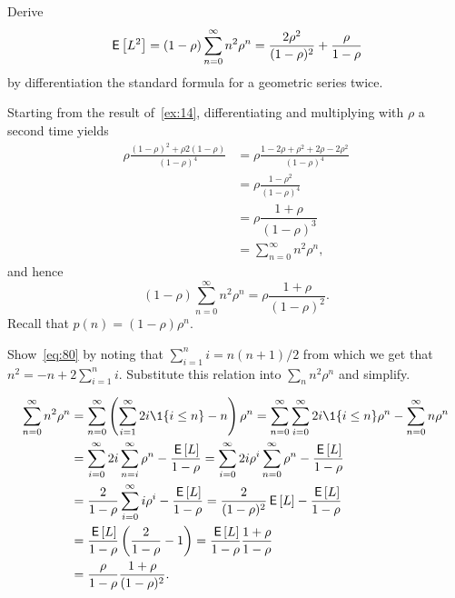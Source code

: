 \begin{extra}\label{ex:56}
  Derive
\begin{equation}\label{eq:80}
  \,\mathsf{E}\left[L^2\right]= (1-\rho) \sum_{n=0}^\infty n^2 \rho^n = \frac{2\rho^2}{(1-\rho)^2} + \frac{\rho}{1-\rho}
\end{equation}
by differentiation the standard formula for a geometric series twice.
\begin{solution}
    Starting from the result of~\cref{ex:14},  differentiating and multiplying with $\rho$ a second time yields
\begin{equation*}
  \begin{split}
\rho \frac{(1-\rho)^2 + \rho2(1-\rho)}{(1-\rho)^4} 
&= \rho \frac{1-2\rho+\rho^2 + 2\rho-2\rho^2}{(1-\rho)^4} \\
&= \rho \frac{1-\rho^2}{(1-\rho)^4} \\
&=\rho \dfrac{1+\rho}{(1-\rho)^3}\\
&=\sum_{n=0}^{\infty}n^2\rho^n,
  \end{split}
\end{equation*}
and hence
\begin{equation*}
(1-\rho)\sum_{n=0}^{\infty}n^2\rho^n = \rho\dfrac{1+\rho}{(1-\rho)^2}.
\end{equation*}
Recall that $p(n) = (1-\rho)\rho^n$. 
\end{solution}
\end{extra}


\begin{extra} Show~\cref{eq:80} by noting that
$\sum_{i=1}^n i= n(n+1)/2$ from which we get that
$n^2 = -n + 2\sum_{i=1}^n i$. Substitute this relation into
$\sum_n n^2 \rho^n$ and simplify.
\begin{solution}
\begin{align*}
    \sum_{n=0}^\infty n^2 \rho^n 
&=    \sum_{n=0}^\infty \left(\sum_{i=1}^\infty 2i \1{i\leq n}  - n\right)\rho^n 
=    \sum_{n=0}^\infty \sum_{i=0}^\infty 2i\1{i\leq n}\rho^n  - \sum_{n=0}^\infty n\rho^n \\
&=    \sum_{i=0}^\infty 2i \sum_{n=i}^\infty \rho^n  - \frac{\E L}{1-\rho} 
=    \sum_{i=0}^\infty 2i \rho^i \sum_{n=0}^\infty \rho^n  - \frac{\E L}{1-\rho} \\
&=    \frac2{1-\rho} \sum_{i=0}^\infty i \rho^i   - \frac{\E L}{1-\rho} 
=    \frac2{(1-\rho)^2} \E L - \frac{\E L}{1-\rho} \\
&=    \frac{\E L}{1-\rho}  \left(\frac2{1-\rho}  - 1\right) 
=    \frac{\E L}{1-\rho}  \frac{1+\rho}{1-\rho} \\
&=    \frac{\rho}{1-\rho}  \frac{1+\rho}{(1-\rho)^2}.
\end{align*}
\end{solution}
\end{extra}

